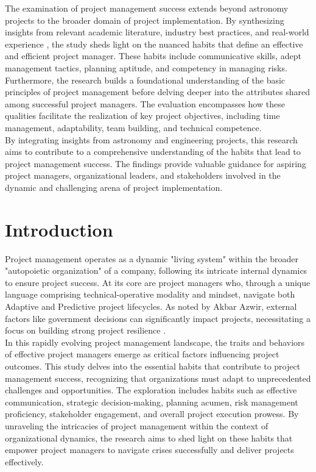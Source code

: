 \documentclass{article}
\begin{document}
The examination of project management success extends beyond astronomy projects to the broader domain of project implementation. By synthesizing insights from relevant academic literature, industry best practices, and real-world experience \cite{Nieto-Rodriguez2021}, the study sheds light on the nuanced habits that define an effective and efficient project manager. These habits include communicative skills, adept management tactics, planning aptitude, and competency in managing risks.\\

Furthermore, the research builds a foundational understanding of the basic principles of project management before delving deeper into the attributes shared among successful project managers. The evaluation encompasses how these qualities facilitate the realization of key project objectives, including time management, adaptability, team building, and technical competence.\\

By integrating insights from astronomy and engineering projects, this research aims to contribute to a comprehensive understanding of the habits that lead to project management success. The findings provide valuable guidance for aspiring project managers, organizational leaders, and stakeholders involved in the dynamic and challenging arena of project implementation.

\newpage

\section{Introduction}
Project management operates as a dynamic "living system" within the broader "autopoietic organization" of a company, following its intricate internal dynamics to ensure project success. At its core are project managers who, through a unique language comprising technical-operative modality and mindset, navigate both Adaptive and Predictive project lifecycles. As noted by Akbar Azwir, external factors like government decisions can significantly impact projects, necessitating a focus on building strong project resilience \cite{Lorenzo, Daniele}.\\

In this rapidly evolving project management landscape, the traits and behaviors of effective project managers emerge as critical factors influencing project outcomes. This study delves into the essential habits that contribute to project management success, recognizing that organizations must adapt to unprecedented challenges and opportunities. The exploration includes habits such as effective communication, strategic decision-making, planning acumen, risk management proficiency, stakeholder engagement, and overall project execution prowess. By unraveling the intricacies of project management within the context of organizational dynamics, the research aims to shed light on these habits that empower project managers to navigate crises successfully and deliver projects effectively.
\end{document}
